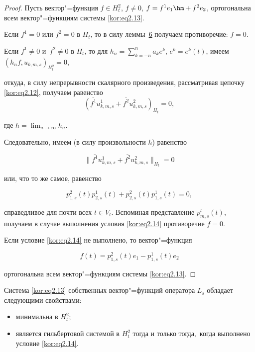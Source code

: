 \begin{proof} Пусть вектор"=функция $f\in H_t^2$, $f\ne0$, $f=f^1e_1\hm +f^2e_2$, ортогональна всем вектор"=функциям системы \eqref{kor:eq2.13}. 

Если $f^1=0$ или $f^2=0$ в $H_t$, то в силу леммы~\hyperlink{korn:lemma:6}{6} получаем противоречие: $f=0$. 

Если $f^1\ne0$ и~$f^2\ne0$ в $H_t$, то для $h_n=\sum_{k=-n}^na_ke^k$, $e^k=e^k(t)$, имеем $(h_nf,u_{k,m,s})_{H_t^2}=0$, 

откуда, в силу непрерывности скалярного произведения, рассматривая цепочку \eqref{kor:eq2.12}, получаем равенство $$(\overline{f^1}u_{k,m,s}^1+\overline{f^2}u_{k,m,s}^2)_{H_t}=0,$$ 

где $h=\lim_{n\to\infty}h_n$. 

Следовательно, имеем (в силу произвольности $h$) равенство

$$\|\overline{f^1}u_{k,m,s}^1+\overline{f^2}u_{k,m,s}^2\|_{H_t}=0$$

или, что то же самое, равенство

$$p_{1,s}^2(t)p_{2,s}^1(t)+p_{2,s}^2(t)p_{1,s}^1(t)=0,$$

справедливое для почти всех $t\in V_t$. Вспоминая представление $p_{m,s}^l(t)$, получаем  в случае выполнения условия \eqref{kor:eq2.14}  противоречие $f = 0$.



Если условие \eqref{kor:eq2.14} не выполнено, то вектор"=функция

$$f(t)=p_{1,s}^2(t)e_1-p_{1,s}^1(t)e_2$$

ортогональна всем вектор"=функциям системы \eqref{kor:eq2.13}. \end{proof}



\smallskip



\hypertarget{korn:lemma:8}{}



\begin{lemma}[8]Система \eqref{kor:eq2.13} собственных вектор"=функций оператора $L_s$ обладает следующими свойствами{\rm :}



\begin{itemize}

\item[а\/\rm)] минимальна в $H_t^2;$



\item[б\/\rm)] является гильбертовой системой в $H_t^2$ тогда и только тогда$,$ когда выполнено условие \eqref{kor:eq2.14}$.$

\end{itemize}



\end{lemma}



